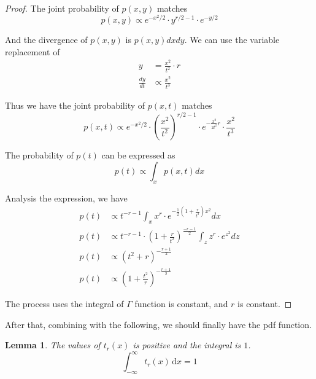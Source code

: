 \documentclass[a4paper]{article}
\newtheorem{lemma}{Lemma}[section]
\begin{document}
\begin{proof}
    The joint probability of $p(x, y)$ matches
    \begin{equation*}
        p(x, y) \propto e^{-x^2/2} \cdot y^{r/2-1} \cdot e^{-y/2}
    \end{equation*}

    And the divergence of $p(x, y)$ is $p(x, y) dx dy$.
    We can use the variable replacement of
    \begin{equation*}
        \begin{align}
            y             & = \frac{x^2}{t^2} \cdot r \\
            \frac{dy}{dt} & \propto \frac{x^2}{t^3}
        \end{align}
    \end{equation*}

    Thus we have the joint probability of $p(x, t)$ matches
    \begin{equation*}
        p(x, t) \propto e^{-x^2/2} \cdot (\frac{x^2}{t^2})^{r/2-1} \cdot e^{-\frac{x^2}{2t^2}r} \cdot \frac{x^2}{t^3}
    \end{equation*}

    The probability of $p(t)$ can be expressed as
    \begin{equation*}
        p(t) \propto \int_{x} p(x, t) dx
    \end{equation*}

    Analysis the expression, we have
    \begin{equation*}
        \begin{align}
            p(t) & \propto t^{-r-1} \int_{x} x^{r} \cdot e^{-\frac{1}{2}(1+\frac{r}{t^2})x^2} dx           \\
            p(t) & \propto t^{-r-1} \cdot (1+\frac{r}{t^2})^\frac{-r-1}{2} \int_{z} z^{r} \cdot e^{z^2} dz \\
            p(t) & \propto (t^2 + r) ^ {-\frac{r+1}{2}}                                                    \\
            p(t) & \propto (1+\frac{t^2}{r})^{-\frac{r+1}{2}}
        \end{align}
    \end{equation*}

    The process uses the integral of $\Gamma$ function is constant, and $r$ is constant.
\end{proof}

After that, combining with the following, we should finally have the pdf function.

\begin{lemma} \label{lemma: The pdf of Student's t-distribution is a pdf}
    The values of $t_r(x)$ is positive and the integral is $1$.
    \begin{equation*}
        \int_{-\infty}^{\infty} t_r(x) \,\mathrm{d}x = 1
    \end{equation*}

\end{lemma}
\end{document}
